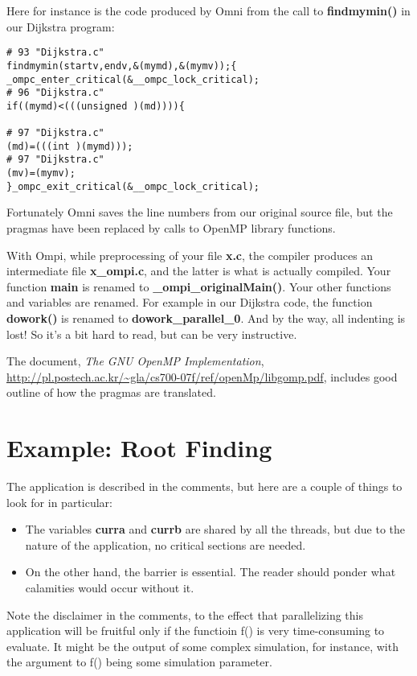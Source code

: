 Here for instance is the code produced by Omni from the call to {\bf
findmymin()} in our Dijkstra program:

\begin{Verbatim}[fontsize=\relsize{-2}]
# 93 "Dijkstra.c"
findmymin(startv,endv,&(mymd),&(mymv));{
_ompc_enter_critical(&__ompc_lock_critical);
# 96 "Dijkstra.c"
if((mymd)<(((unsigned )(md)))){

# 97 "Dijkstra.c"
(md)=(((int )(mymd)));
# 97 "Dijkstra.c"
(mv)=(mymv);
}_ompc_exit_critical(&__ompc_lock_critical);
\end{Verbatim}

Fortunately Omni saves the line numbers from our original source file,
but the pragmas have been replaced by calls to OpenMP library functions.

With Ompi, while preprocessing of your file {\bf x.c}, the compiler
produces an intermediate file {\bf x\_ompi.c}, and the latter is what is
actually compiled.  Your function {\bf main} is renamed to {\bf
\_ompi\_originalMain()}.  Your other functions and variables are
renamed.  For example in our Dijkstra code, the function {\bf dowork()}
is renamed to {\bf dowork\_parallel\_0}.  And by the way, all indenting
is lost!  So it's a bit hard to read, but can be very instructive.

The document, {\it The GNU OpenMP Implementation},
\url{http://pl.postech.ac.kr/~gla/cs700-07f/ref/openMp/libgomp.pdf},
includes good outline of how the pragmas are translated.

\section{Example:  Root Finding}

The application is described in the comments, but here are a couple of
things to look for in particular:

\begin{itemize}

\item The variables {\bf curra} and {\bf currb} are shared by all the
threads, but due to the nature of the application, no critical sections
are needed.

\item On the other hand, the barrier is essential.  The reader should
ponder what calamities would occur without it.

\end{itemize}

Note the disclaimer in the comments, to the effect that parallelizing
this application will be fruitful only if the functioin f() is very
time-consuming to evaluate.  It might be the output of some complex
simulation, for instance, with the argument to f() being some simulation
parameter.

